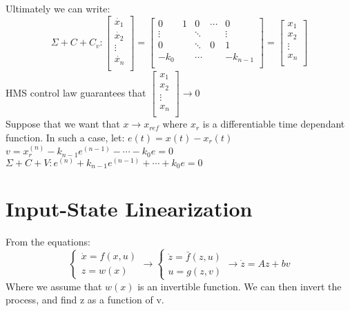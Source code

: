 {    Ultimately we can write:
    \begin{equation}
        \label{FL:dfn_4}
        \Sigma +C +C_v : \begin{bmatrix}
            \dot{x_1}  \\
            \dot{x_2}  \\
            \vdots \\
            \dot{x_n}  \\
        \end{bmatrix}
        = \begin{bmatrix}
            0 & 1& 0& \cdots &0  \\
            \vdots &  & \ddots&  &\vdots  \\
            0 &  & \ddots& 0 & 1  \\
            -k_0 &  & \cdots &  & -k_{n-1}  \\
        \end{bmatrix}
        = \begin{bmatrix}
            x_1  \\
            x_2  \\
            \vdots \\
            x_n  \\
        \end{bmatrix}
    \end{equation}
    HMS control law guarantees that
        $ \begin{bmatrix}
            x_1  \\
            x_2  \\
            \vdots \\
            x_n  \\
        \end{bmatrix} \rightarrow 0$
        \\ Suppose that we want that $x \rightarrow x_{ref}$ where $x_r$ is a differentiable time dependant function.
        In such a case, let: $e(t) = x(t) - x_r(t)$\\
        $v = x_r^{(n)} - k_{n-1}e^{(n-1)}-\cdots -k_{0}e = 0$\\
        $\Sigma+ C +V : e^{(n)}+k_{n-1}e^{(n-1)} + \cdots + k_0e=0$
}

\section{Input-State Linearization}
From the equations:
\begin{equation}
    \begin{cases}
          \dot{x} = f(x,u)\\
         z = w(x)
    \end{cases} \rightarrow 
    \begin{cases}
        \dot{z}=\bar{f}(z,u)\\
        u = g(z,v)
    \end{cases} \rightarrow  \dot{z} = Az +bv
\end{equation}
Where we assume that $w(x)$ is an invertible function. We can then invert the process, and find z as a function of v.

